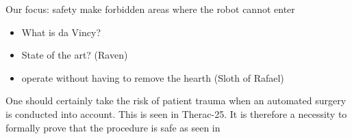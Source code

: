 Our focus:
safety
make forbidden areas where the robot cannot enter


\begin{itemize}
\item What is da Vincy?
\item State of the art? (Raven)
\item operate without having to remove the hearth (Sloth of Rafael)
\end{itemize}
One should certainly take the risk of patient trauma when an automated surgery is conducted into account. This is seen in Therac-25. It is therefore a necessity to formally prove that the procedure is safe as seen in \citep{bib:safety}
